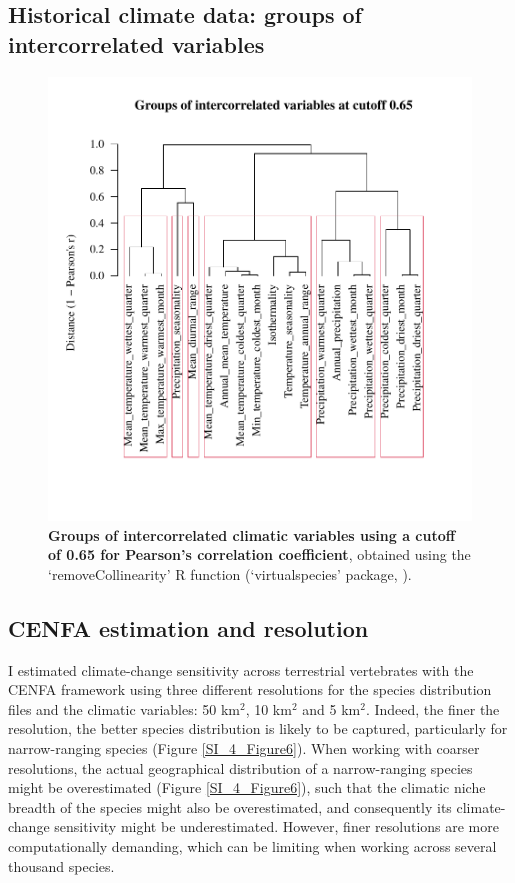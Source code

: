 \subsection{Historical climate data: groups of intercorrelated variables}
\begin{figure}[h!]
\centering
\includegraphics[scale=0.9, trim={0 1.75cm 0 2cm},clip]{Supporting/Chapter4/Figures/ClimVars_groups2}
\caption[Groups of intercorrelated climatic variables using a cutoff of 0.65 for Pearson's correlation coefficient]{\textbf{Groups of intercorrelated climatic variables using a cutoff of 0.65 for Pearson's correlation coefficient}, obtained using the `removeCollinearity' R function (`virtualspecies' package, \citet{virtualspecies}).}
\label{SI_4_Figure5}
\end{figure}


\subsection{CENFA estimation and resolution}
I estimated climate-change sensitivity across terrestrial vertebrates with the CENFA framework using three different resolutions for the species distribution files and the climatic variables: 50 km$^2$, 10 km$^2$ and 5 km$^2$. Indeed, the finer the resolution, the better species distribution is likely to be captured, particularly for narrow-ranging species (Figure \ref{SI_4_Figure6}). When working with coarser resolutions, the actual geographical distribution of a narrow-ranging species might be overestimated (Figure \ref{SI_4_Figure6}), such that the climatic niche breadth of the species might also be overestimated, and consequently its climate-change sensitivity might be underestimated. However, finer resolutions are more computationally demanding, which can be limiting when working across several thousand species. 

